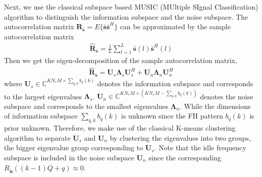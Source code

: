\documentclass[journal,10pt]{IEEEtran}
\begin{document}
Next, we use the classical subspace based MUSIC (MUltiple SIgnal Classification) algorithm to distinguish the information subspace and the noise subspace. 
The autocorrelation matrix $\boldsymbol{R}_{\bar{\boldsymbol{s}}}=E\{\bar{\boldsymbol{s}}\bar{\boldsymbol{s}}^H\}$ can be approximated by the sample autocorrelation matrix
\begin{align}\label{eq:16}
   \hat{\boldsymbol{R}}_{\bar{\boldsymbol{s}}}=\frac{1}{L}\sum_{l=1}^L \bar{\boldsymbol{s}}(l)\bar{\boldsymbol{s}}^H(l)
\end{align}
Then we get the eigen-decomposition of the sample autocorrelation matrix,
\begin{align}\label{eq:17}
    \hat{\boldsymbol{R}}_{\bar{\boldsymbol{s}}}=\boldsymbol{U}_s\boldsymbol{\Lambda}_s\boldsymbol{U}_s^H+\boldsymbol{U}_n\boldsymbol{\Lambda}_n\boldsymbol{U}_n^H
\end{align}
where $\boldsymbol{U}_s\in \mathbb{C}^{KN_rM\times \sum_{q,k}b_q(k)}$  denotes the information subspace and corresponds to the largest eigenvalues $\boldsymbol{\Lambda}_s$. $\boldsymbol{U}_n\in \mathbb{C}^{KN_rM\times (KN_rM-\sum_{q,k}b_q(k))}$ denotes the noise subspace and corresponds to the smallest eigenvalues $\boldsymbol{\Lambda}_n$. 
While the dimensions of information subspace $\sum_{q,k}b_q(k)$ is unknown since the FH pattern $b_q(k)$ is prior unknown. 
Therefore, we make use of the classical K-means clustering algorithm \cite{Bengio2013Deep,Angelov2012Fundamentals} to separate  $\boldsymbol{U}_s$ and $\boldsymbol{U}_n$ by clustering the eigenvalues into two groups, the bigger eigenvalue group corresponding to $\boldsymbol{U}_s$.
Note that the idle frequency subspace is included in the noise subspace $\boldsymbol{U}_n$ since the corresponding $R_{\tilde{\boldsymbol{u}}}((k-1)Q+q)\approx 0$.
\end{document}
